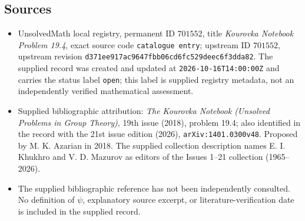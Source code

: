 \documentclass[11pt]{article}
\begin{document}
\subsection{Sources}
\begin{itemize}
\item UnsolvedMath local registry, permanent ID \(701552\), title \emph{Kourovka Notebook Problem 19.4}, exact source code \texttt{catalogue entry}; upstream ID \(701552\), upstream revision \texttt{d371ee917ac9647fbb06cd6fc529deec6f3dda82}. The supplied record was created and updated at \texttt{2026-10-16T14:00:00Z} and carries the status label \texttt{open}; this label is supplied registry metadata, not an independently verified mathematical assessment.
\item Supplied bibliographic attribution: \emph{The Kourovka Notebook (Unsolved Problems in Group Theory)}, 19th issue (2018), problem 19.4; also identified in the record with the 21st issue edition (2026), \texttt{arXiv:1401.0300v48}. Proposed by M. K. Azarian in 2018. The supplied collection description names E. I. Khukhro and V. D. Mazurov as editors of the Issues 1--21 collection (1965--2026).
\item The supplied bibliographic reference has not been independently consulted. No definition of \(\psi\), explanatory source excerpt, or literature-verification date is included in the supplied record.
\end{itemize}
\end{document}
